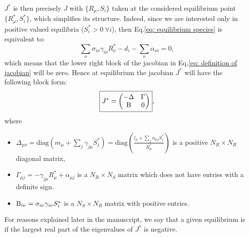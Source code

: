 \documentclass[12pt, titlepage]{report}
\begin{document}
$J^*$ is then precisely $J$  with $\{R_\mu, S_i\}$ taken at the considered equilibrium point $\{R_\mu^*, S_i^*\}$, which simplifies its structure. Indeed,
since we are interested only in positive valued equilibria (\ie $S^*_i > 0 \ \forall i$), then Eq.\eqref{eq: equilibrium species} is equivalent to:
\begin{equation}
  \sum_\nu \sigma_{i\nu} \gamma_{i\nu}R^*_\nu -d_i - \sum_\nu \alpha_{\nu i} = 0,
\end{equation}
which means that the lower right block of the jacobian in Eq.\eqref{eq: definition of jacobian} will be zero. Hence at equilibrium the jacobian $J^*$ will have the following block form:
\begin{equation}
\boxed{
  J^* = \begin{pmatrix}
  -\Delta & \Gamma \\
  \text{B} & 0
\end{pmatrix}
}, \label{eq: jacobian at equilibrium}
\end{equation}
where
\begin{itemize}
  \item $\Delta_{\mu\nu} = \text{diag}(m_\mu+\sum_j \gamma_{j\mu} S^*_j) = \text{diag}\left(\frac{l_\mu + \sum_j \alpha_{\mu j}S_j^*}{R^*_\mu}\right)$ is a positive $N_R \times N_R$ diagonal matrix,
  \item $\Gamma_{\mu j} = -\gamma_{j\mu}R^*_\mu + \alpha_{\mu j}$ is a $N_R \times N_S$ matrix which does not have entries with a definite sign.
  \item $\text{B}_{i\nu} = \sigma_{i\nu} \gamma_{i\nu} S^*_i$ is a $N_S \times N_R$ matrix with positive entries.
\end{itemize}
For reasons explained later in the manuscript, we say that a given equilibrium is  if the largest real part of the eigenvalues of $J^*$ is negative.
\end{document}
